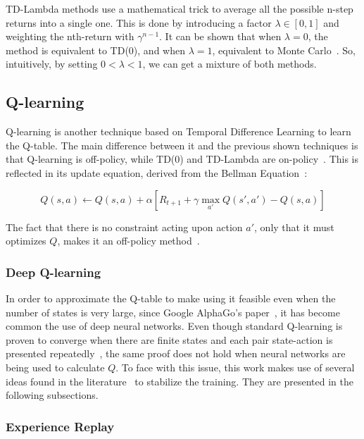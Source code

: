 \documentclass[11pt,twoside]{article}
\begin{document}
TD-Lambda methods use a mathematical trick to average all the possible n-step returns into a single one. This is done by introducing a factor $\lambda \in [0, 1]$ and weighting the nth-return with $\gamma^{n-1}$. It can be shown that when $\lambda = 0$, the method is equivalent to TD(0), and when $\lambda = 1$, equivalent to Monte Carlo~\cite{dp_approx}. So, intuitively, by setting $0 < \lambda < 1$, we can get a mixture of both methods.

\subsection{Q-learning}

Q-learning is another technique based on Temporal Difference Learning to learn the Q-table. The main difference between it and the previous shown techniques is that Q-learning is off-policy, while TD(0) and TD-Lambda are on-policy~\cite{sutton}. This is reflected in its update equation, derived from the Bellman Equation~\cite{qlearning}:

\begin{equation} \label{qlearning}
	Q(s, a) \leftarrow Q(s, a) + \alpha [R_{t+1} + \gamma \max_{a'} Q(s', a') - Q(s,a)]
\end{equation}

The fact that there is no constraint acting upon action $a'$, only that it must optimizes $Q$, makes it an off-policy method~\cite{qlearning}.

\subsubsection{Deep Q-learning}

In order to approximate the Q-table to make using it feasible even when the number of states is very large, since Google AlphaGo's paper~\cite{alphago}, it has become common the use of deep neural networks. Even though standard Q-learning is proven to converge when there are finite states and each pair state-action is presented repeatedly~\cite{convergence_qlearning}, the same proof does not hold when neural networks are being used to calculate $Q$. To face with this issue, this work makes use of several ideas found in the literature~\cite{replay} to stabilize the training. They are presented in the following subsections.

\subsubsection{Experience Replay}\label{experience}
\end{document}
